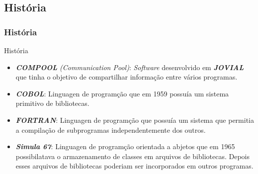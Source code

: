  \subsection{História}
\begin{frame}
 \frametitle{História}

  \begin{block}{História}

   \begin{itemize}

    \item \emph{\textbf{COMPOOL} (Communication Pool)}: \emph{Software} desenvolvido em \emph{\textbf{JOVIAL}}
   que tinha o objetivo de compartilhar informação entre vários programas.

    \item \emph{\textbf{COBOL}}: Linguagen de programção que em 1959 possuía um sistema primitivo de bibliotecas.

    \item \emph{\textbf{FORTRAN}}: Linguagen de programção que possuía um sistema que permitia a compilação de
   subprogramas independentemente dos outros.

    \item \emph{\textbf{Simula 67}}: Linguagen de programção orientada a abjetos que em 1965 possibilatava o
   armazenamento de classes em arquivos de bibliotecas. Depois esses arquivos de bibliotecas poderiam ser
   incorporados em outros programas.

   \end{itemize}

  \end{block}

\end{frame}


